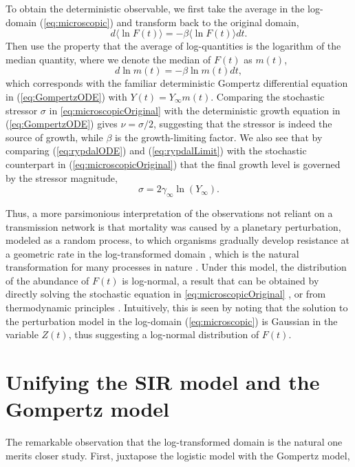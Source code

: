 \documentclass{article}
\begin{document}
To obtain the deterministic observable, we first take the average in the log-domain (\ref{eq:microscopic}) and transform back to the original domain, 
\begin{equation}
d\langle\ln{F(t)}\rangle = -\beta \langle\ln{F(t)}\rangle dt.
\end{equation}
Then use the property that the average of log-quantities is the logarithm of the median quantity, where we denote the median of $F(t)$ as $m(t)$, 
\begin{equation}
\label{eq:medianGomp}
d\ln{m(t)} = -\beta \ln{m(t)} dt,
\end{equation}
which corresponds with the familiar deterministic Gompertz differential equation in (\ref{eq:GompertzODE}) with $Y(t) = Y_\infty m(t)$. 
Comparing the stochastic stressor $\sigma$ in \ref{eq:microscopicOriginal} with the deterministic growth equation in (\ref{eq:GompertzODE}) gives $\nu=\sigma/2$, suggesting that the stressor is indeed the source of growth, while $\beta$ is the growth-limiting factor. 
We also see that by comparing (\ref{eq:rypdalODE}) and (\ref{eq:rypdalLimit}) with the stochastic counterpart in (\ref{eq:microscopicOriginal}) that the final growth level is governed by the stressor magnitude,
\begin{equation}
\sigma = 2\gamma_{\infty}\ln{(Y_{\infty})}.
\end{equation}

Thus, a more parsimonious interpretation of the observations not reliant on a transmission network is that mortality was caused by a planetary perturbation, modeled as a random process, to which organisms gradually develop resistance at a geometric rate in the log-transformed domain \citep{boxenbaum2017hypotheses,neafsey1988gompertz}, which is the natural transformation for many processes in nature \citep{zhang1994log}. 
Under this model, the distribution of the abundance of $F(t)$ is log-normal, a result that can be obtained by directly solving the stochastic equation in \ref{eq:microscopicOriginal} \citep{skiadas2010exact,petroni2020gompertz}, or from thermodynamic principles \citep{sitaram1984statistical,gunasekaran1982lon}. 
Intuitively, this is seen by noting that the solution to the perturbation model in the log-domain (\ref{eq:microscopic}) is Gaussian in the variable $Z(t)$, thus suggesting a log-normal distribution of $F(t)$. 

\section{Unifying the SIR model and the Gompertz model}
The remarkable observation that the log-transformed domain is the natural one merits closer study. First, juxtapose the logistic model with the Gompertz model,
\end{document}
